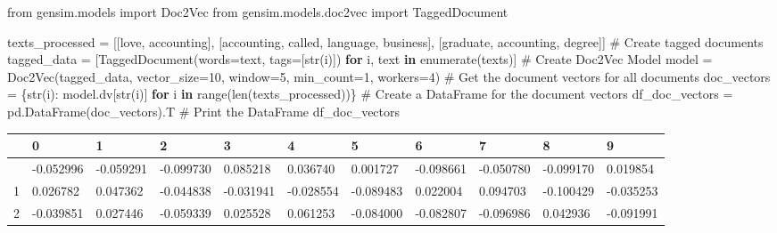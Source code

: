 \documentclass[
  letterpaper,
  DIV=11,
  numbers=noendperiod]{scrreprt}
\newenvironment{Shaded}{\begin{snugshade}}{\end{snugshade}}
\newcommand{\BuiltInTok}[1]{\textcolor[rgb]{0.00,0.23,0.31}{#1}}
\newcommand{\CommentTok}[1]{\textcolor[rgb]{0.37,0.37,0.37}{#1}}
\newcommand{\ControlFlowTok}[1]{\textcolor[rgb]{0.00,0.23,0.31}{\textbf{#1}}}
\newcommand{\DecValTok}[1]{\textcolor[rgb]{0.68,0.00,0.00}{#1}}
\newcommand{\ImportTok}[1]{\textcolor[rgb]{0.00,0.46,0.62}{#1}}
\newcommand{\KeywordTok}[1]{\textcolor[rgb]{0.00,0.23,0.31}{\textbf{#1}}}
\newcommand{\NormalTok}[1]{\textcolor[rgb]{0.00,0.23,0.31}{#1}}
\newcommand{\OperatorTok}[1]{\textcolor[rgb]{0.37,0.37,0.37}{#1}}
\newcommand{\StringTok}[1]{\textcolor[rgb]{0.13,0.47,0.30}{#1}}
\newcounter{none} %
\begin{document}
\begin{Shaded}
\begin{Highlighting}[]
\ImportTok{from}\NormalTok{ gensim.models }\ImportTok{import}\NormalTok{ Doc2Vec}
\ImportTok{from}\NormalTok{ gensim.models.doc2vec }\ImportTok{import}\NormalTok{ TaggedDocument}

\NormalTok{texts\_processed }\OperatorTok{=}\NormalTok{ [[}\StringTok{\textquotesingle{}love\textquotesingle{}}\NormalTok{, }\StringTok{\textquotesingle{}accounting\textquotesingle{}}\NormalTok{],}
\NormalTok{ [}\StringTok{\textquotesingle{}accounting\textquotesingle{}}\NormalTok{, }\StringTok{\textquotesingle{}called\textquotesingle{}}\NormalTok{, }\StringTok{\textquotesingle{}language\textquotesingle{}}\NormalTok{, }\StringTok{\textquotesingle{}business\textquotesingle{}}\NormalTok{],}
\NormalTok{ [}\StringTok{\textquotesingle{}graduate\textquotesingle{}}\NormalTok{, }\StringTok{\textquotesingle{}accounting\textquotesingle{}}\NormalTok{, }\StringTok{\textquotesingle{}degree\textquotesingle{}}\NormalTok{]]}
\CommentTok{\# Create tagged documents}
\NormalTok{tagged\_data }\OperatorTok{=}\NormalTok{ [TaggedDocument(words}\OperatorTok{=}\NormalTok{text, tags}\OperatorTok{=}\NormalTok{[}\BuiltInTok{str}\NormalTok{(i)]) }\ControlFlowTok{for}\NormalTok{ i, text }\KeywordTok{in} \BuiltInTok{enumerate}\NormalTok{(texts)]}
\CommentTok{\# Create Doc2Vec Model }
\NormalTok{model }\OperatorTok{=}\NormalTok{ Doc2Vec(tagged\_data, vector\_size}\OperatorTok{=}\DecValTok{10}\NormalTok{, window}\OperatorTok{=}\DecValTok{5}\NormalTok{, min\_count}\OperatorTok{=}\DecValTok{1}\NormalTok{, workers}\OperatorTok{=}\DecValTok{4}\NormalTok{)}
\CommentTok{\# Get the document vectors for all documents}
\NormalTok{doc\_vectors }\OperatorTok{=}\NormalTok{ \{}\BuiltInTok{str}\NormalTok{(i): model.dv[}\BuiltInTok{str}\NormalTok{(i)] }\ControlFlowTok{for}\NormalTok{ i }\KeywordTok{in} \BuiltInTok{range}\NormalTok{(}\BuiltInTok{len}\NormalTok{(texts\_processed))\} }
\CommentTok{\# Create a DataFrame for the document vectors }
\NormalTok{df\_doc\_vectors }\OperatorTok{=}\NormalTok{ pd.DataFrame(doc\_vectors).T }
\CommentTok{\# Print the DataFrame }
\NormalTok{df\_doc\_vectors}
\end{Highlighting}
\end{Shaded}

{\def\LTcaptype{none} %
\begin{longtable}[]{@{}lllllllllll@{}}
\toprule\noalign{}
& 0 & 1 & 2 & 3 & 4 & 5 & 6 & 7 & 8 & 9 \\
\midrule\noalign{}
\endhead
\bottomrule\noalign{}
\endlastfoot
0 & -0.052996 & -0.059291 & -0.099730 & 0.085218 & 0.036740 & 0.001727 &
-0.098661 & -0.050780 & -0.099170 & 0.019854 \\
1 & 0.026782 & 0.047362 & -0.044838 & -0.031941 & -0.028554 & -0.089483
& 0.022004 & 0.094703 & -0.100429 & -0.035253 \\
2 & -0.039851 & 0.027446 & -0.059339 & 0.025528 & 0.061253 & -0.084000 &
-0.082807 & -0.096986 & 0.042936 & -0.091991 \\
\end{longtable}
}
\end{document}
